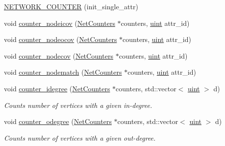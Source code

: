 \begin{Indent}
\begin{DoxyCompactItemize}
\hyperlink{namespacebarry_1_1counters_1_1network_a7649cd035af193258a69058aea425941}{N\+E\+T\+W\+O\+R\+K\+\_\+\+C\+O\+U\+N\+T\+ER} (init\+\_\+single\+\_\+attr)
\item 
void \hyperlink{namespacebarry_1_1counters_1_1network_a42073ab360a9f796126662927acc5470}{counter\+\_\+nodeicov} (\hyperlink{namespacebarry_1_1counters_1_1network_aa72fdb34752ac24167a06ee196a8fff6}{Net\+Counters} $\ast$counters, \hyperlink{namespacebarry_a11dfc53ddb4672278319aa04f1e09a6c}{uint} attr\+\_\+id)
\item 
void \hyperlink{namespacebarry_1_1counters_1_1network_a61b287d49772a5bfa3d11d42f70ec1d8}{counter\+\_\+nodeocov} (\hyperlink{namespacebarry_1_1counters_1_1network_aa72fdb34752ac24167a06ee196a8fff6}{Net\+Counters} $\ast$counters, \hyperlink{namespacebarry_a11dfc53ddb4672278319aa04f1e09a6c}{uint} attr\+\_\+id)
\item 
void \hyperlink{namespacebarry_1_1counters_1_1network_a0f18e2af090591c3f47c95849ec324da}{counter\+\_\+nodecov} (\hyperlink{namespacebarry_1_1counters_1_1network_aa72fdb34752ac24167a06ee196a8fff6}{Net\+Counters} $\ast$counters, \hyperlink{namespacebarry_a11dfc53ddb4672278319aa04f1e09a6c}{uint} attr\+\_\+id)
\item 
void \hyperlink{namespacebarry_1_1counters_1_1network_a2333b5893d1ba684925be6855bc33868}{counter\+\_\+nodematch} (\hyperlink{namespacebarry_1_1counters_1_1network_aa72fdb34752ac24167a06ee196a8fff6}{Net\+Counters} $\ast$counters, \hyperlink{namespacebarry_a11dfc53ddb4672278319aa04f1e09a6c}{uint} attr\+\_\+id)
\item 
void \hyperlink{namespacebarry_1_1counters_1_1network_a460e9b4cd736d8ab02ebeb6f84e3e80d}{counter\+\_\+idegree} (\hyperlink{namespacebarry_1_1counters_1_1network_aa72fdb34752ac24167a06ee196a8fff6}{Net\+Counters} $\ast$counters, std\+::vector$<$ \hyperlink{namespacebarry_a11dfc53ddb4672278319aa04f1e09a6c}{uint} $>$ d)
\begin{DoxyCompactList}\small\item\em Counts number of vertices with a given in-\/degree. \end{DoxyCompactList}\item 
void \hyperlink{namespacebarry_1_1counters_1_1network_adb3a690ba6de839767b66f8bda088e2e}{counter\+\_\+odegree} (\hyperlink{namespacebarry_1_1counters_1_1network_aa72fdb34752ac24167a06ee196a8fff6}{Net\+Counters} $\ast$counters, std\+::vector$<$ \hyperlink{namespacebarry_a11dfc53ddb4672278319aa04f1e09a6c}{uint} $>$ d)
\begin{DoxyCompactList}\small\item\em Counts number of vertices with a given out-\/degree. \end{DoxyCompactList}\item 

\end{DoxyCompactItemize}
\end{Indent}
